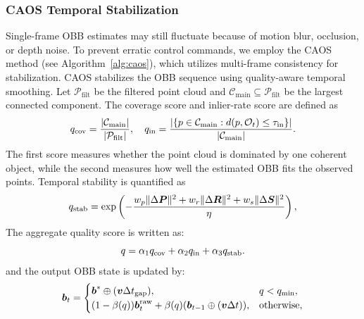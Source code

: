 \subsubsection{CAOS Temporal Stabilization}
Single-frame OBB estimates may still fluctuate because of motion blur, occlusion, or depth noise. To prevent erratic control commands, we employ the CAOS method (see Algorithm~\ref{alg:caos}), which utilizes multi-frame consistency for stabilization. CAOS stabilizes the OBB sequence using quality-aware temporal smoothing. Let $\mathcal{P}_{\text{filt}}$ be the filtered point cloud and $\mathcal{C}_{\text{main}}\subseteq\mathcal{P}_{\text{filt}}$ be the largest connected component. The coverage score and inlier-rate score are defined as
\begin{equation}
q_{\text{cov}}=\frac{|\mathcal{C}_{\text{\text{main}}}|}{|\mathcal{P}_{\text{\text{filt}}}|},\quad
q_{\text{in}}=\frac{\left|\{p\in\mathcal{C}_{\text{\text{main}}}:d(p,\mathcal{O}_{t})\le\tau_{\text{\text{in}}}\}\right|}{|\mathcal{C}_{\text{\text{main}}}|}.
\label{eq:qcov}
\end{equation}
The first score measures whether the point cloud is dominated by one coherent object, while the second measures how well the estimated OBB fits the observed points. Temporal stability is quantified as
\begin{equation}
q_{\text{\text{stab}}}=\exp\left(-\frac{w_p\|\Delta\boldsymbol{P}\|^2+w_r\|\Delta\boldsymbol{R}\|^2+w_s\|\Delta\boldsymbol{S}\|^2}{\eta}\right),
\label{eq:qstab}
\end{equation}
The aggregate quality score is written as:
\begin{equation}
q=\alpha_1q_{\text{cov}}+\alpha_2q_{\text{\text{in}}}+\alpha_3q_{\text{\text{stab}}}.
\end{equation}
and the output OBB state is updated by:
\begin{equation}
\boldsymbol{b}_{t}=\begin{cases}
\boldsymbol{b}^{*}\oplus(\boldsymbol{v}\Delta t_{\text{gap}}), & q<q_{\text{\text{min}}},\\
(1-\beta(q))\boldsymbol{b}_{t}^{\text{raw}}+\beta(q)(\boldsymbol{b}_{t-1}\oplus(\boldsymbol{v}\Delta t)), & \mathrm{otherwise},
\end{cases}
\label{eq:caos}
\end{equation}
